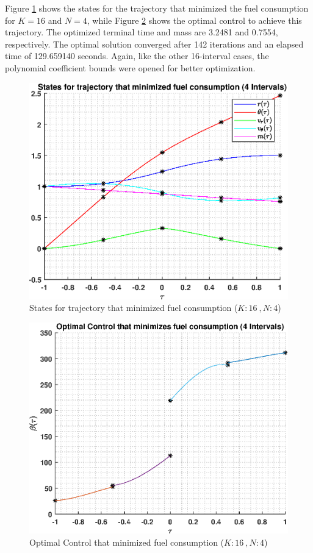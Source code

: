 \documentclass[]{article}
\begin{document}
\vspace{2mm}\newline 
Figure \ref{fig:directStatesK16Poly4} shows the states for the trajectory that minimized the fuel consumption for \(K = 16\) and  \(N = 4\), while Figure \ref{fig:directControlK16Poly4} shows the optimal control to achieve this trajectory. The optimized terminal time and mass are 3.2481 and 0.7554, respectively. The optimal solution converged after 142 iterations and an elapsed time of 129.659140 seconds. Again, like the other 16-interval cases, the polynomial coefficient bounds were opened for better optimization. 
\begin{figure}
	\centering
	\includegraphics[scale=0.75]{directStatesK16Poly4.eps}
	\caption{States for trajectory that minimized fuel consumption (\(K:16\ , N:4\))}
	\label{fig:directStatesK16Poly4}
\end{figure}
\begin{figure}
	\centering
	\includegraphics[scale=0.75]{directControlK16Poly4.eps}
	\caption{Optimal Control that minimized fuel consumption (\(K:16\ , N:4\))}
	\label{fig:directControlK16Poly4}
\end{figure}
\end{document}
